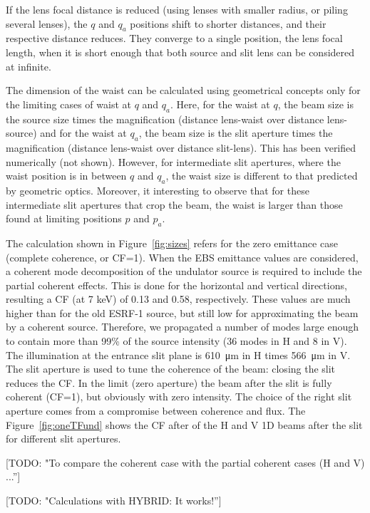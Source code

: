 \documentclass{iucr}              %
\newcommand{\todo}[1]{{\color{red}[TODO: "#1'']}}
\begin{document}
If the lens focal distance is reduced (using lenses with smaller radius, or piling several lenses), the $q$ and $q_a$ positions shift to shorter distances, and  their respective distance reduces. They converge to a single position, the lens focal length, when it is short enough that both source and slit lens can be considered at infinite. 

The dimension of the waist can be calculated using geometrical concepts only for the limiting cases of waist at $q$ and $q_a$. Here, for the waist at $q$, the beam size is the source size times the magnification (distance lens-waist over distance lens-source) and for the waist at $q_a$, the beam size is the slit aperture times the magnification (distance lens-waist over distance slit-lens). This has been verified numerically (not shown). However, for intermediate slit apertures, where the waist position is in between $q$ and $q_a$, the waist size is different to that predicted by geometric optics. Moreover, it interesting to observe that for these intermediate slit apertures that crop the beam, the waist is larger than those found at limiting positions $p$ and $p_a$.

The calculation shown in Figure~\ref{fig:sizes} refers for the zero emittance case (complete coherence, or CF=1). When the EBS emittance values are considered, a coherent mode decomposition of the undulator source is required to include the partial coherent effects. This is done for the horizontal and vertical directions, resulting a CF (at 7 keV) of 0.13 and 0.58, respectively. These values are much higher than for the old ESRF-1 source, but still low for approximating the beam by a coherent source. Therefore, we propagated a number of modes large enough to contain more than 99\% of the source intensity (36 modes in H and 8 in V). The illumination at the entrance slit plane is \SI{610}{\micro\meter} in H times \SI{566}{\micro\meter} in V. The slit aperture is used to tune the coherence of the beam: closing the slit reduces the CF. In the limit (zero aperture) the beam after the slit is fully coherent (CF=1), but obviously with zero intensity. The choice of the right slit aperture comes from a compromise between coherence and flux. The Figure~\ref{fig:oneTFund} shows the CF after of the H and V 1D beams after the slit for different slit apertures. 

\todo{To compare the coherent case with the partial coherent cases (H and V) ...}


\todo{Calculations with HYBRID: It works!}
\end{document}
